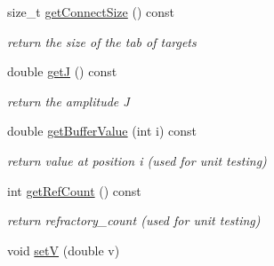 \begin{DoxyCompactItemize}
size\-\_\-t \hyperlink{classNeuron_a31d6fd5ff3351bb18e9f0e00115a0a14}{get\-Connect\-Size} () const 
\begin{DoxyCompactList}\small\item\em return the size of the tab of targets \end{DoxyCompactList}\item 
double \hyperlink{classNeuron_a320ab48e220523371b266385c650e31f}{get\-J} () const 
\begin{DoxyCompactList}\small\item\em return the amplitude J \end{DoxyCompactList}\item 
double \hyperlink{classNeuron_ae718bf1d1e5772dcef94301f73418cca}{get\-Buffer\-Value} (int i) const 
\begin{DoxyCompactList}\small\item\em return value at position i (used for unit testing) \end{DoxyCompactList}\item 
int \hyperlink{classNeuron_ac1c1ab9d1b0d0a05814b56e1f3f10ca4}{get\-Ref\-Count} () const 
\begin{DoxyCompactList}\small\item\em return refractory\-\_\-count (used for unit testing) \end{DoxyCompactList}\item 
\hypertarget{classNeuron_abf35fc96817f39a5bdfe33540d2a137a}{void \hyperlink{classNeuron_abf35fc96817f39a5bdfe33540d2a137a}{set\-V} (double v)}\label{classNeuron_abf35fc96817f39a5bdfe33540d2a137a}


\end{DoxyCompactItemize}
